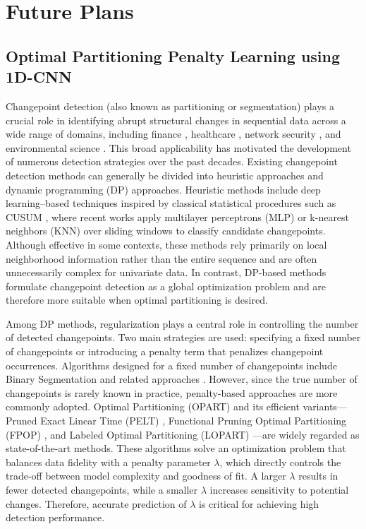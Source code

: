 \documentclass[12pt]{article}
\begin{document}
\section{Future Plans}
\subsection{Optimal Partitioning Penalty Learning using 1D-CNN}

Changepoint detection (also known as partitioning or segmentation) plays a crucial role in identifying abrupt structural changes in sequential data across a wide range of domains, including finance \citep{app:finance}, healthcare \citep{cancer}, network security \citep{app:network}, and environmental science \citep{app:climate}. 
This broad applicability has motivated the development of numerous detection strategies over the past decades. 
Existing changepoint detection methods can generally be divided into heuristic approaches and dynamic programming (DP) approaches. 
Heuristic methods include deep learning–based techniques inspired by classical statistical procedures such as CUSUM \citep{review:cusum, review:james1987tests}, where recent works \citep{review:li24automatic, review:ermshaus2023clasp} apply multilayer perceptrons (MLP) or k-nearest neighbors (KNN) over sliding windows to classify candidate changepoints. 
Although effective in some contexts, these methods rely primarily on local neighborhood information rather than the entire sequence and are often unnecessarily complex for univariate data. 
In contrast, DP-based methods formulate changepoint detection as a global optimization problem and are therefore more suitable when optimal partitioning is desired. 

Among DP methods, regularization plays a central role in controlling the number of detected changepoints. 
Two main strategies are used: specifying a fixed number of changepoints or introducing a penalty term that penalizes changepoint occurrences. 
Algorithms designed for a fixed number of changepoints include Binary Segmentation and related approaches \citep{review:binseg, review:bai2003computation, pelt, rigaill2015pruned}. 
However, since the true number of changepoints is rarely known in practice, penalty-based approaches are more commonly adopted. 
Optimal Partitioning (OPART) \citep{jackson:05} and its efficient variants—Pruned Exact Linear Time (PELT) \citep{pelt}, Functional Pruning Optimal Partitioning (FPOP) \citep{fpop}, and Labeled Optimal Partitioning (LOPART) \citep{lopart}—are widely regarded as state-of-the-art methods. 
These algorithms solve an optimization problem that balances data fidelity with a penalty parameter $\lambda$, which directly controls the trade-off between model complexity and goodness of fit. 
A larger $\lambda$ results in fewer detected changepoints, while a smaller $\lambda$ increases sensitivity to potential changes. 
Therefore, accurate prediction of $\lambda$ is critical for achieving high detection performance. 
\end{document}
